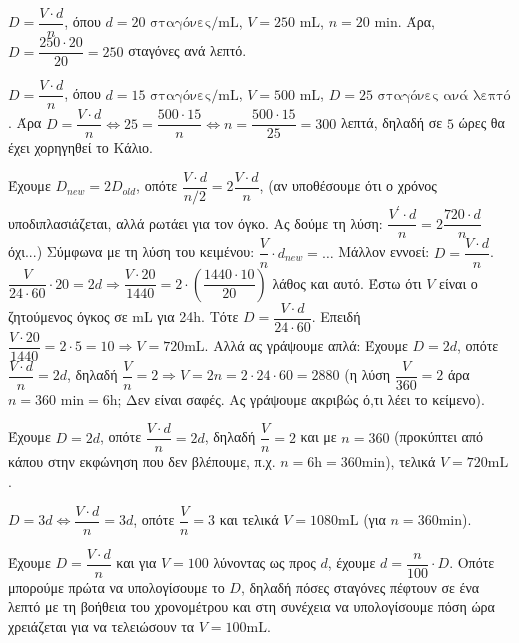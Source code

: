 
\begin{alist}
\item
\begin{rlist}
\item $D = \dfrac{V \cdot d}{n}$, όπου $d = 20 \text{ σταγόνες/mL}$, $V = 250 \text{ mL}$, $n = 20 \text{ min}$. Άρα,
$D = \dfrac{250 \cdot 20}{20} = 250$ σταγόνες ανά λεπτό.
\item $D = \dfrac{V \cdot d}{n}$, όπου $d = 15 \text{ σταγόνες/mL}$, $V = 500 \text{ mL}$, $D = 25 \text{ σταγόνες ανά λεπτό}$. Άρα
$D = \dfrac{V \cdot d}{n} \Leftrightarrow 25 = \dfrac{500 \cdot 15}{n} \Leftrightarrow n = \dfrac{500 \cdot 15}{25} = 300$ λεπτά, δηλαδή σε $5$ ώρες θα έχει χορηγηθεί το Κάλιο.
\end{rlist}

\item
\begin{rlist}
\item Έχουμε $D_{new} = 2D_{old}$, οπότε
$\dfrac{V \cdot d}{n/2} = 2 \dfrac{V \cdot d}{n}$, (αν υποθέσουμε ότι ο χρόνος υποδιπλασιάζεται, αλλά ρωτάει για τον όγκο. Ας δούμε τη λύση: $\dfrac{V^\prime \cdot d}{n} = 2\dfrac{720 \cdot d}{n}$ όχι...)
Σύμφωνα με τη λύση του κειμένου: $\dfrac{V}{n} \cdot d_{new} = \dots$
Μάλλον εννοεί: $D = \dfrac{V \cdot d}{n}$.
$\dfrac{V}{24 \cdot 60} \cdot 20 = 2d \Rightarrow \dfrac{V \cdot 20}{1440} = 2 \cdot (\dfrac{1440 \cdot 10}{20})$ λάθος και αυτό.
Έστω ότι $V$ είναι ο ζητούμενος όγκος σε $\text{mL}$ για 24h. Τότε $D = \dfrac{V \cdot d}{24 \cdot 60}$. Επειδή $\dfrac{V \cdot 20}{1440} = 2 \cdot 5 = 10 \Rightarrow V = 720\text{mL}$.
Αλλά ας γράψουμε απλά:
Έχουμε $D = 2d$, οπότε $\dfrac{V \cdot d}{n} = 2d$, δηλαδή $\dfrac{V}{n} = 2 \Rightarrow V = 2n = 2 \cdot 24 \cdot 60 = 2880$ (η λύση $\dfrac{V}{360} = 2$ άρα $n=360 \text{ min}=6\text{h}$; Δεν είναι σαφές. Ας γράψουμε ακριβώς ό,τι λέει το κείμενο).

Έχουμε $D = 2d$, οπότε $\dfrac{V \cdot d}{n} = 2d$, δηλαδή $\dfrac{V}{n} = 2$ και με $n = 360$ (προκύπτει από κάπου στην εκφώνηση που δεν βλέπουμε, π.χ. $n = 6\text{h} = 360\text{min}$), τελικά $V = 720\text{mL}$.

\item $D = 3d \Leftrightarrow \dfrac{V \cdot d}{n} = 3d$, οπότε $\dfrac{V}{n} = 3$ και τελικά $V = 1080\text{mL}$ (για $n=360\text{min}$).
\end{rlist}

\item Έχουμε $D = \dfrac{V \cdot d}{n}$ και για $V = 100$ λύνοντας ως προς $d$, έχουμε $d = \dfrac{n}{100} \cdot D$. Οπότε μπορούμε πρώτα να υπολογίσουμε το $D$, δηλαδή πόσες σταγόνες πέφτουν σε ένα λεπτό με τη βοήθεια του χρονομέτρου και στη συνέχεια να υπολογίσουμε πόση ώρα χρειάζεται για να τελειώσουν τα $V = 100\text{mL}$.
\end{alist}

